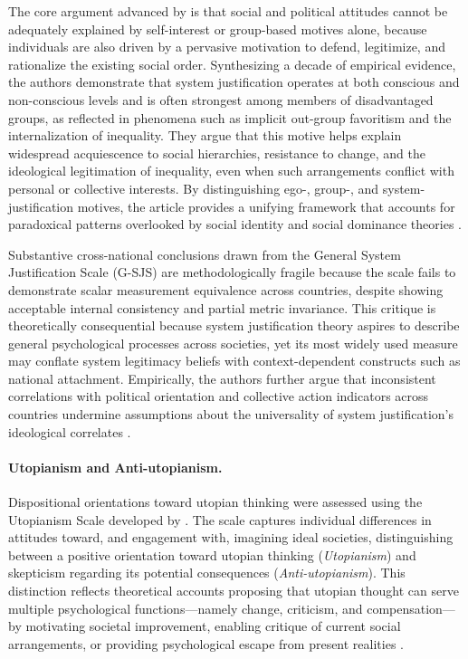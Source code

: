 \documentclass[jou,floatsintext]{apa7}
\begin{document}
The core argument advanced by \textcite{jostDecadeSystemJustification2004} is that social and political attitudes cannot be adequately explained by self-interest or group-based motives alone, because individuals are also driven by a pervasive motivation to defend, legitimize, and rationalize the existing social order. Synthesizing a decade of empirical evidence, the authors demonstrate that system justification operates at both conscious and non-conscious levels and is often strongest among members of disadvantaged groups, as reflected in phenomena such as implicit out-group favoritism and the internalization of inequality. They argue that this motive helps explain widespread acquiescence to social hierarchies, resistance to change, and the ideological legitimation of inequality, even when such arrangements conflict with personal or collective interests. By distinguishing ego-, group-, and system-justification motives, the article provides a unifying framework that accounts for paradoxical patterns overlooked by social identity and social dominance theories \parencite{jostDecadeSystemJustification2004}. 

Substantive cross-national conclusions drawn from the General System Justification Scale (G-SJS) are methodologically fragile   because the scale fails to demonstrate scalar measurement equivalence across countries, despite showing acceptable internal consistency and partial metric invariance.  This critique is theoretically consequential because system justification theory aspires to describe general psychological processes across societies, yet its most widely used measure may conflate system legitimacy beliefs with context-dependent constructs such as national attachment. Empirically, the authors further argue that inconsistent correlations with political orientation and collective action indicators across countries undermine assumptions about the universality of system justification’s ideological correlates \parencite{vesperUseGeneralSystem2022}. 



\paragraph{Utopianism and Anti-utopianism.}
Dispositional orientations toward utopian thinking were assessed using the Utopianism Scale developed by \cite{fernandoFunctionsUtopiaHow2018}. The scale captures individual differences in attitudes toward, and engagement with, imagining ideal societies, distinguishing between a positive orientation toward utopian thinking (\textit{Utopianism}) and skepticism regarding its potential consequences (\textit{Anti-utopianism}). This distinction reflects theoretical accounts proposing that utopian thought can serve multiple psychological functions---namely change, criticism, and compensation---by motivating societal improvement, enabling critique of current social arrangements, or providing psychological escape from present realities \parencite{levitasConceptUtopia2010}.
\end{document}
